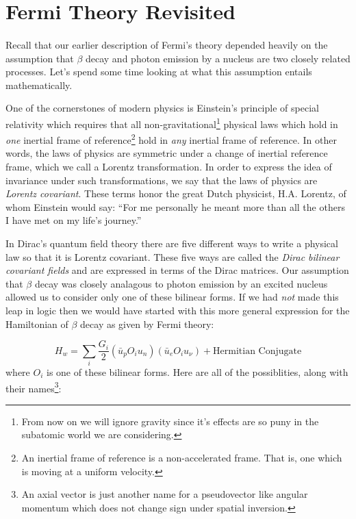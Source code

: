 \documentclass[a4paper,12pt]{book}
\begin{document}
\section{Fermi Theory Revisited}

\paragraph{}Recall that our earlier description of Fermi's theory depended heavily on the assumption that $\beta$ decay and photon emission by a nucleus are two closely related processes. Let's spend some time looking at what this assumption entails mathematically.

One of the cornerstones of modern physics is Einstein's principle of special relativity which requires that all non-gravitational\footnote{From now on we will ignore gravity since it's effects are so puny in the subatomic world we are considering.} physical laws which hold in \emph{one} inertial frame of reference\footnote{An inertial frame of reference is a non-accelerated frame. That is, one which is moving at a uniform velocity.} hold in \emph{any} inertial frame of reference. In other words, the laws of physics are symmetric under a change of inertial reference frame, which we call a Lorentz transformation. In order to express the idea of invariance under such transformations, we say that the laws of physics are \emph{Lorentz covariant}. These terms honor the great Dutch physicist, H.A. Lorentz, of whom Einstein would say: ``For me personally he meant more than all the others I have met on my life's journey.''

In Dirac's quantum field theory there are five different ways to write a physical law so that it is Lorentz covariant. These five ways are called the \emph{Dirac bilinear covariant fields} and are expressed in terms of the Dirac matrices\cite{maggiore}. Our assumption that $\beta$ decay was closely analagous to photon emission by an excited nucleus allowed us to consider only one of these bilinear forms. If we had \emph{not} made this leap in logic then we would have started with this more general expression for the Hamiltonian of $\beta$ decay as given by Fermi theory:

\begin{equation}\label{general:fermi}
 H_{w}=\displaystyle\sum_{i}\frac{G_{i}}{2}\left(\bar{u}_{p}O_{i}u_{n}\right)\left(\bar{u}_{e}O_{i}u_{\nu}\right) + \text{Hermitian Conjugate}
\end{equation}
where $O_{i}$ is one of these bilinear forms. Here are all of the possiblities, along with their names\footnote{An axial vector is just another name for a pseudovector like angular momentum which does not change sign under spatial inversion.}:
\end{document}

